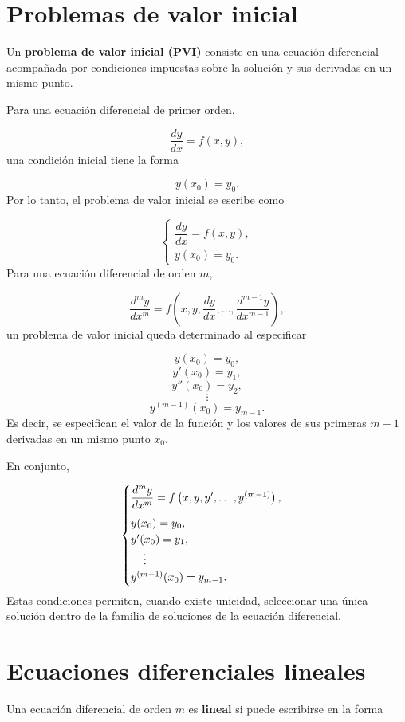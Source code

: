 \documentclass[12pt,a4paper]{article}
\begin{document}
	\clearpage
	\section{Problemas de valor inicial}
	
	Un \textbf{problema de valor inicial (PVI)} consiste en una ecuación diferencial acompañada por condiciones impuestas sobre la solución y sus derivadas en un mismo punto.
	
	Para una ecuación diferencial de primer orden,
	
	\[
	\frac{dy}{dx}
	=
	f(x,y),
	\]
	una condición inicial tiene la forma
	
	\[
	y(x_0)=y_0.
	\]
	Por lo tanto, el problema de valor inicial se escribe como
	
	\[
	\begin{cases}
		\dfrac{dy}{dx}=f(x,y),\\[0.3cm]
		y(x_0)=y_0.
	\end{cases}
	\]
	Para una ecuación diferencial de orden \(m\),
	
	\[
	\frac{d^m y}{dx^m}
	=
	f\left(
	x,
	y,
	\frac{dy}{dx},
	\dots,
	\frac{d^{m-1}y}{dx^{m-1}}
	\right),
	\]
	un problema de valor inicial queda determinado al especificar
	
	\[
	y(x_0)=y_0,
	\]
	\[
	y'(x_0)=y_1,
	\]
	\[
	y''(x_0)=y_2,
	\]
	\[
	\vdots
	\]
	\[
	y^{(m-1)}(x_0)=y_{m-1}.
	\]
	Es decir, se especifican el valor de la función y los valores de sus primeras \(m-1\) derivadas en un mismo punto \(x_0\).
	
	En conjunto,
	
	\[
	\begin{cases}
		\dfrac{d^m y}{dx^m}
		=
		f\left(
		x,
		y,
		y',
		\dots,
		y^{(m-1)}
		\right),\\[0.3cm]
		y(x_0)=y_0,\\
		y'(x_0)=y_1,\\
		\hspace{0.4cm}\vdots\\
		y^{(m-1)}(x_0)=y_{m-1}.
	\end{cases}
	\]
	Estas condiciones permiten, cuando existe unicidad, seleccionar una única solución dentro de la familia de soluciones de la ecuación diferencial.
	
	\clearpage
	\section{Ecuaciones diferenciales lineales}
	
	Una ecuación diferencial de orden \(m\) es \textbf{lineal} si puede escribirse en la forma
	
\end{document}
